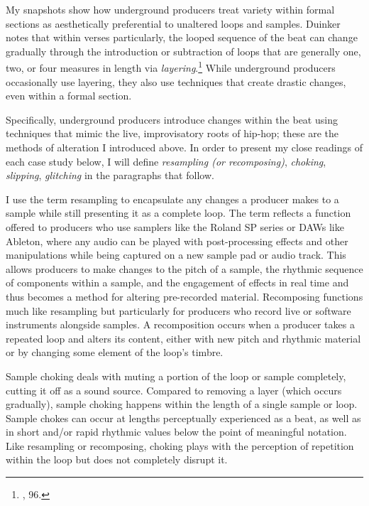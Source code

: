 My snapshots show how underground producers treat variety within formal sections as aesthetically preferential to unaltered loops and samples. Duinker notes that within verses particularly, the looped sequence of the beat can change gradually through the introduction or subtraction of loops that are generally one, two, or four measures in length via \emph{layering}.\footnote{\cite{benduinkerSongFormMainstreaming2020}, 96.} While underground producers occasionally use layering, they also use techniques that create drastic changes, even within a formal section. 

Specifically, underground producers introduce changes within the beat using techniques that mimic the live, improvisatory roots of hip-hop; these are the methods of alteration I introduced above. In order to present my close readings of each case study below, I will define \emph{resampling (or recomposing)}, \emph{choking}, \emph{slipping}, \emph{glitching} in the paragraphs that follow.

I use the term resampling to encapsulate any changes a producer makes to a sample while still presenting it as a complete loop. The term reflects a function offered to producers who use samplers like the Roland SP series or DAWs like Ableton, where any audio can be played with post-processing effects and other manipulations while being captured on a new sample pad or audio track. This allows producers to make changes to the pitch of a sample, the rhythmic sequence of components within a sample, and the engagement of effects in real time and thus becomes a method for altering pre-recorded material. Recomposing functions much like resampling but particularly for producers who record live or software instruments alongside samples. A recomposition occurs when a producer takes a repeated loop and alters its content, either with new pitch and rhythmic material or by changing some element of the loop's timbre. 

Sample choking deals with muting a portion of the loop or sample completely, cutting it off as a sound source. Compared to removing a layer (which occurs gradually), sample choking happens within the length of a single sample or loop. Sample chokes can occur at lengths perceptually experienced as a beat, as well as in short and/or rapid rhythmic values below the point of meaningful notation. Like resampling or recomposing, choking plays with the perception of repetition within the loop but does not completely disrupt it.

